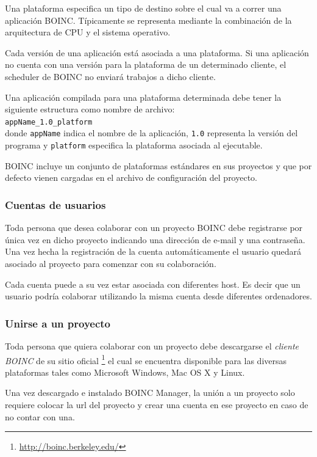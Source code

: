Una plataforma especifica un tipo de destino sobre el cual va a correr una aplicación BOINC. Típicamente se representa mediante la combinación de la arquitectura de CPU y el sistema operativo. 

Cada versión de una aplicación está asociada a una plataforma. Si una aplicación no cuenta con una versión para la plataforma de un determinado cliente, el scheduler de BOINC no enviará trabajos a dicho cliente.

Una aplicación compilada para una plataforma determinada debe tener la siguiente estructura como nombre de archivo:\\
\texttt{appName\_1.0\_platform}\\
donde \texttt{appName} indica el nombre de la aplicación, \texttt{1.0} representa la versión del programa y \texttt{platform} especifica la plataforma asociada al ejecutable.

BOINC incluye un conjunto de plataformas estándares en sus proyectos y que por defecto vienen cargadas en el archivo de configuración del proyecto.

\subsubsection{Cuentas de usuarios}

Toda persona que desea colaborar con un proyecto BOINC debe registrarse por única vez en dicho proyecto indicando una dirección de e-mail y una contraseña. Una vez hecha la registración de la cuenta automáticamente el usuario quedará asociado al proyecto para comenzar con su colaboración.

Cada cuenta puede a su vez estar asociada con diferentes host. Es decir que un usuario podría colaborar utilizando la misma cuenta desde diferentes ordenadores.

\subsubsection{Unirse a un proyecto}

Toda persona que quiera colaborar con un proyecto debe descargarse el \textit{cliente BOINC} de su sitio oficial \footnote{\url{http://boinc.berkeley.edu/}} el cual se encuentra disponible para las diversas plataformas tales como Microsoft Windows, Mac OS X y Linux.

Una vez descargado e instalado BOINC Manager, la unión a un proyecto solo requiere colocar la url del proyecto y crear una cuenta en ese proyecto en caso de no contar con una.

